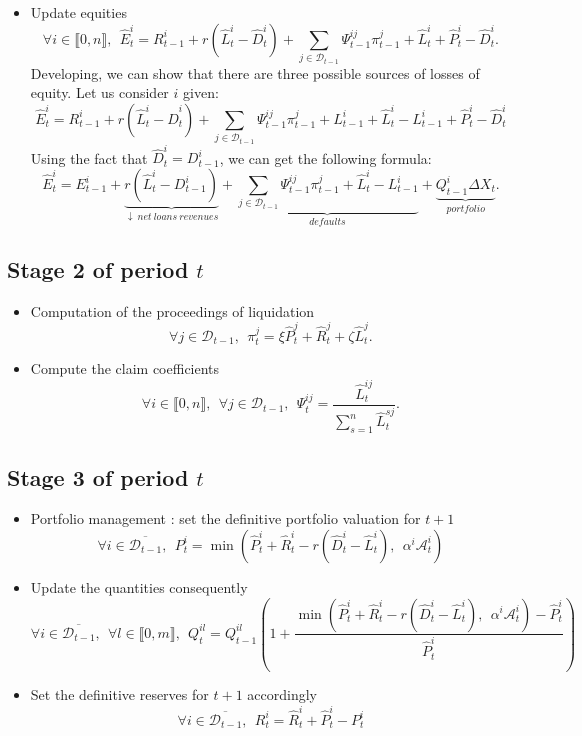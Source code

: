 \documentclass{article}
\newcommand{\wh}{\widehat}
\begin{document}
\begin{itemize}
    \item Update equities
    $$\forall i \in \llbracket 0, n \rrbracket,~~ \wh E^i_t = R_{t-1}^i + r (\wh L_t^i - \wh D_t^i) + \sum_{j \in \mathcal{D}_{t-1}} \Psi_{t-1}^{ij} \pi_{t-1}^j + \wh L^i_t + \wh P_t^i - \wh D^i_t.$$
    Developing, we can show that there are three possible sources of losses of equity. Let us consider $i$ given: 
    $$\wh E^i_t = R_{t-1}^i + r (\wh L_t^i - \wh D_t^i) + \sum_{j \in \mathcal{D}_{t-1}} \Psi_{t-1}^{ij} \pi_{t-1}^j + L_{t-1}^i + \wh L_t^i - L_{t-1}^i + \wh P_t^i - \wh D^i_t$$
    Using the fact that $\wh D_t^i = D_{t-1}^i$, we can get the following formula: 
    $$\wh E^i_t = E^i_{t-1} + \underbrace{r (\wh L_t^i - D_{t-1}^i)}_{\downarrow~net~loans~revenues} + \underbrace{\sum_{j \in \mathcal{D}_{t-1}} \Psi_{t-1}^{ij} \pi_{t-1}^j + \wh L_t^i - L_{t-1}^i}_{defaults} + \underbrace{Q_{t-1}^i\Delta X_t}_{portfolio}.$$
\end{itemize}


\subsection{Stage 2 of period $t$}
\begin{itemize}
    
    \item Computation of the proceedings of liquidation
    $$ \forall j \in \mathcal{D}_{t-1},~~ \pi_t^j = \xi \widehat{P}_t^j + \widehat{R}_t^j + \zeta \wh L^j_t.$$ 
        
    \item Compute the claim coefficients
    $$\forall i \in \llbracket 0, n \rrbracket,~~\forall j \in \mathcal{D}_{t-1},~~\Psi_t^{ij} = \frac{ \wh L_t^{ij}}{\sum_{s=1}^n \wh L_t^{sj}}.$$
\end{itemize}


\subsection{Stage 3 of period $t$}

\begin{itemize}

\item Portfolio management : set the definitive portfolio valuation for $t+1$
$$\forall i \in \overline{\mathcal{D}_{t-1}},~~P_t^{i} = \min(\widehat{P}_t^i + \widehat{R}_t^i - r( \wh D_t^i - \wh L_t^i),~~\alpha^i \mathcal{A}_t^i)$$

\item Update the quantities consequently
$$\forall i \in \overline{\mathcal{D}_{t-1}},~~\forall l \in \llbracket 0, m \rrbracket,~~Q_t^{il} = Q_{t-1}^{il}\left(1 + \frac{\min(\widehat{P}_t^i + \widehat{R}_t^i - r( \wh D_t^i - \wh L_t^i),~~\alpha^i \mathcal{A}_t^i) - \widehat{P}_t^i}{\widehat{P}_t^i} \right)$$

\item Set the definitive reserves for $t+1$ accordingly
$$\forall i \in \overline{\mathcal{D}_{t-1}},~~R_t^i = \widehat{R}_t^i + \widehat{P}_t^i - P_t^i$$
\end{itemize}
\end{document}
